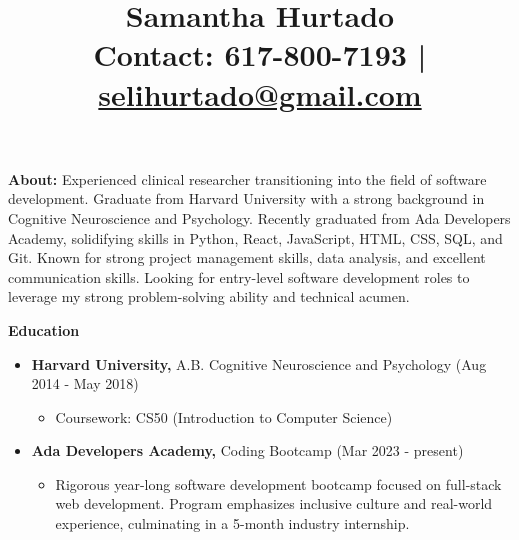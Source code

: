 \documentclass[a4paper,10pt]{article}
\title{\vspace{-3cm}Samantha Hurtado \\ \vspace{3mm} \normalsize \textbf{Contact:} 617-800-7193 | \href{mailto:selihurtado@gmail.com}{selihurtado@gmail.com}}
\date{\vspace{-5ex}}
\begin{document}
\maketitle


\noindent
\textbf{About:} Experienced clinical researcher transitioning into the field of software development. Graduate from Harvard University with a strong background in Cognitive Neuroscience and Psychology. Recently graduated from Ada Developers Academy, solidifying skills in Python, React, JavaScript, HTML, CSS, SQL, and Git. Known for strong project management skills, data analysis, and excellent communication skills. Looking for entry-level software development roles to leverage my strong problem-solving ability and technical acumen.\\

\vspace{8pt}

\noindent
\textbf{Education}
\begin{itemize}[noitemsep,topsep=0pt,parsep=0pt,partopsep=0pt,itemsep=2pt,after=\vspace{\baselineskip}]
\item \textbf{Harvard University,} A.B. Cognitive Neuroscience and Psychology (Aug 2014 - May 2018)
\begin{itemize}[noitemsep,topsep=0pt,parsep=0pt,partopsep=0pt,itemsep=2pt]
\item Coursework: CS50 (Introduction to Computer Science)
\end{itemize}
\item \textbf{Ada Developers Academy,} Coding Bootcamp (Mar 2023 - present)
    
\begin{itemize}[noitemsep,topsep=0pt,parsep=0pt,partopsep=0pt,itemsep=2pt]
\item Rigorous year-long software development bootcamp focused on full-stack web development. Program emphasizes inclusive culture and real-world experience, culminating in a 5-month industry internship.
\end{itemize}


\end{itemize}

\vspace{8pt}
\end{document}
